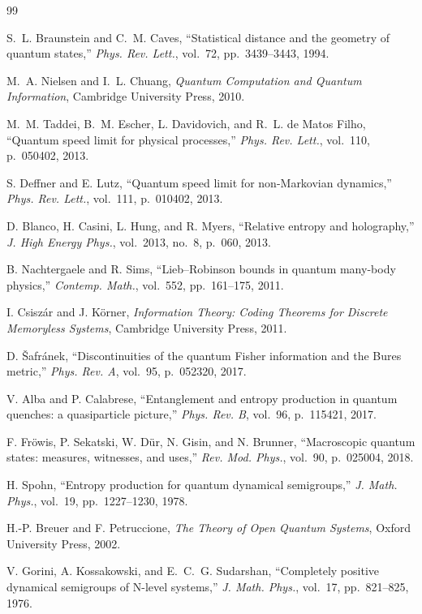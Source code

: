 \documentclass[10pt]{article}
\begin{document}
\begin{thebibliography}{99}

S.~L. Braunstein and C.~M. Caves, 
“Statistical distance and the geometry of quantum states,” 
\emph{Phys. Rev. Lett.}, vol.~72, pp.~3439–3443, 1994.

M.~A. Nielsen and I.~L. Chuang, 
\emph{Quantum Computation and Quantum Information}, 
Cambridge University Press, 2010.

M.~M. Taddei, B.~M. Escher, L. Davidovich, and R.~L. de Matos Filho, 
“Quantum speed limit for physical processes,” 
\emph{Phys. Rev. Lett.}, vol.~110, p.~050402, 2013.

S. Deffner and E. Lutz, 
“Quantum speed limit for non-Markovian dynamics,” 
\emph{Phys. Rev. Lett.}, vol.~111, p.~010402, 2013.

D. Blanco, H. Casini, L. Hung, and R. Myers, 
“Relative entropy and holography,” 
\emph{J. High Energy Phys.}, vol.~2013, no.~8, p.~060, 2013.

B. Nachtergaele and R. Sims, 
“Lieb–Robinson bounds in quantum many-body physics,” 
\emph{Contemp. Math.}, vol.~552, pp.~161–175, 2011.

I. Csiszár and J. Körner, 
\emph{Information Theory: Coding Theorems for Discrete Memoryless Systems}, 
Cambridge University Press, 2011.

D. Šafránek, 
“Discontinuities of the quantum Fisher information and the Bures metric,” 
\emph{Phys. Rev. A}, vol.~95, p.~052320, 2017.

V. Alba and P. Calabrese, 
“Entanglement and entropy production in quantum quenches: a quasiparticle picture,” 
\emph{Phys. Rev. B}, vol.~96, p.~115421, 2017.

F. Fröwis, P. Sekatski, W. Dür, N. Gisin, and N. Brunner, 
“Macroscopic quantum states: measures, witnesses, and uses,” 
\emph{Rev. Mod. Phys.}, vol.~90, p.~025004, 2018.

H. Spohn, 
“Entropy production for quantum dynamical semigroups,” 
\emph{J. Math. Phys.}, vol.~19, pp.~1227–1230, 1978.

H.-P. Breuer and F. Petruccione, 
\emph{The Theory of Open Quantum Systems}, 
Oxford University Press, 2002.

V. Gorini, A. Kossakowski, and E.~C.~G. Sudarshan, 
“Completely positive dynamical semigroups of N-level systems,” 
\emph{J. Math. Phys.}, vol.~17, pp.~821–825, 1976.


\end{thebibliography}
\end{document}
